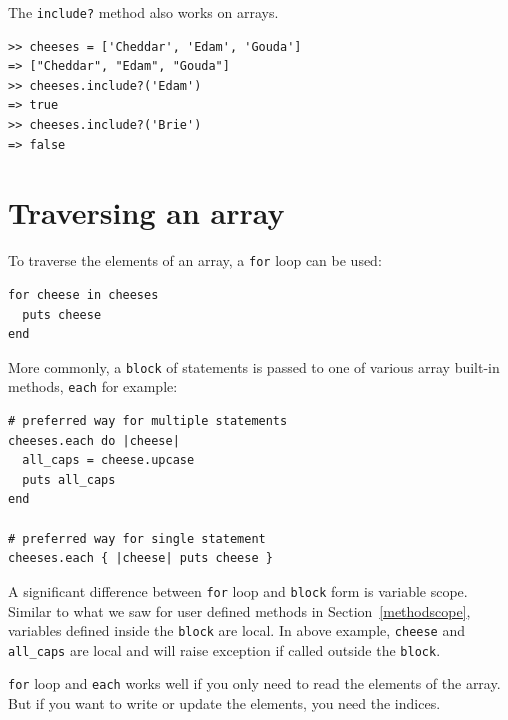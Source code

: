 \documentclass[10pt]{book}
\begin{document}

The {\tt include?} method also works on arrays.

\begin{verbatim}
>> cheeses = ['Cheddar', 'Edam', 'Gouda']
=> ["Cheddar", "Edam", "Gouda"]
>> cheeses.include?('Edam')
=> true
>> cheeses.include?('Brie')
=> false
\end{verbatim}


\section{Traversing an array}

To traverse the elements of an array, a {\tt for} loop can be used:

\begin{verbatim}
for cheese in cheeses
  puts cheese
end
\end{verbatim}
%

More commonly, a {\tt block} of statements is passed to one of various
array built-in methods, {\tt each} for example:

\begin{verbatim}
# preferred way for multiple statements
cheeses.each do |cheese|
  all_caps = cheese.upcase
  puts all_caps
end

# preferred way for single statement
cheeses.each { |cheese| puts cheese }
\end{verbatim}
%

A significant difference between {\tt for} loop and {\tt block} form
is variable scope.  Similar to what we saw for user defined methods in
Section~\ref{methodscope}, variables defined inside the {\tt block}
are local.  In above example, \verb"cheese" and \verb"all_caps" are local
and will raise exception if called outside the {\tt block}.

{\tt for} loop and {\tt each} works well if you only need to read the elements of the
array.  But if you want to write or update the elements, you
need the indices.
\end{document}
